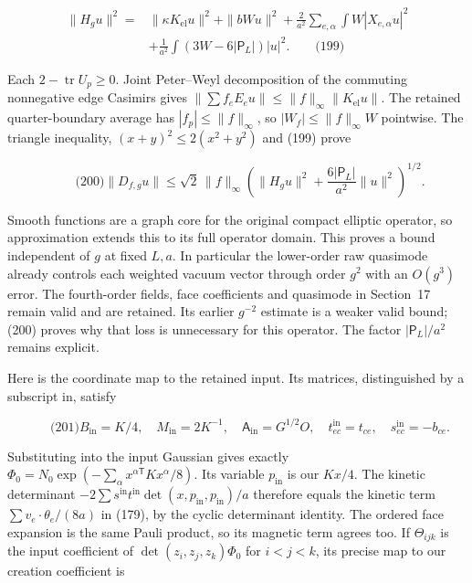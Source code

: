 \[
\begin{aligned}
 \|H_gu\|^2={}&\|\kappa K_{\mathrm{el}}u\|^2+\|bWu\|^2
   +\frac2{a^2}\sum_{e,\alpha}\int W|X_{e,\alpha}u|^2\\
 &+\frac1{a^2}\int(3W-6|\mathsf P_L|)|u|^2.
 \qquad\text{(199)}
\end{aligned}
\]

Each \(2-\operatorname{tr}U_p\ge0\). Joint Peter--Weyl decomposition of
the commuting nonnegative edge Casimirs gives
\(\|\sum f_eE_eu\|\le\|f\|_\infty\|K_{\mathrm{el}}u\|\). The retained
quarter-boundary average has \(|f_p|\le\|f\|_\infty\), so
\(|W_f|\le\|f\|_\infty W\) pointwise. The triangle inequality,
\((x+y)^2\le2(x^2+y^2)\) and (199) prove

\[
\qquad\text{(200)}
 \|D_{f,g}u\|\le\sqrt2\,\|f\|_\infty
 \left(\|H_gu\|^2+\frac{6|\mathsf P_L|}{a^2}\|u\|^2\right)^{1/2}.
\]

Smooth functions are a graph core for the original compact elliptic
operator, so approximation extends this to its full operator domain.
This proves a bound independent of \(g\) at fixed \(L,a\). In particular
the lower-order raw quasimode already controls each weighted vacuum
vector through order \(g^2\) with an \(O(g^3)\) error. The fourth-order
fields, face coefficients and quasimode in Section~17 remain valid and
are retained. Its earlier \(g^{-2}\) estimate is a weaker valid bound;
(200) proves why that loss is unnecessary for this operator. The factor
\(|\mathsf P_L|/a^2\) remains explicit.

Here is the coordinate map to the retained input. Its matrices,
distinguished by a subscript \(\mathrm{in}\), satisfy

\[
\qquad\text{(201)}
 B_{\mathrm{in}}=K/4,\quad M_{\mathrm{in}}=2K^{-1},\quad
 \mathsf A_{\mathrm{in}}=G^{1/2}O,\quad
 t^{\mathrm{in}}_{ec}=t_{ce},\quad s^{\mathrm{in}}_{ec}=-b_{ce}.
\]

Substituting into the input Gaussian gives exactly
\(\Phi_0=N_0\exp(-\sum_\alpha x^{\alpha\mathsf T}Kx^\alpha/8)\). Its
variable \(p_{\mathrm{in}}\) is our \(Kx/4\). The kinetic determinant
\(-2\sum s^{\mathrm{in}}t^{\mathrm{in}}
\det(x,p_{\mathrm{in}},p_{\mathrm{in}})/a\) therefore equals the kinetic
term \(\sum v_e\cdot\theta_e/(8a)\) in (179), by the cyclic determinant
identity. The ordered face expansion is the same Pauli product, so its
magnetic term agrees too. If \(\Theta_{ijk}\) is the input coefficient
of \(\det(z_i,z_j,z_k)\Phi_0\) for \(i<j<k\), its precise map to our
creation coefficient is


